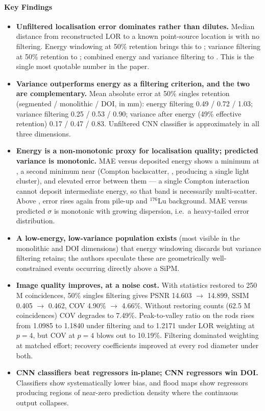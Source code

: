 \paragraph{Key Findings}
\begin{itemize}
    \item \textbf{Unfiltered localisation error dominates rather than dilutes.} Median
        distance from reconstructed LOR to a known point-source location is
        \textbf{} with no filtering. Energy windowing at 50\% retention brings this
        to ; variance filtering at 50\% retention to ; combined energy and
        variance filtering to \textbf{}. This is the single most quotable number
        in the paper.
    \item \textbf{Variance outperforms energy as a filtering criterion, and the two are
        complementary.} Mean absolute error at 50\% singles retention (segmented /
        monolithic / DOI, in mm): energy filtering 0.49 / 0.72 / 1.03; variance filtering
        0.25 / 0.53 / 0.90; variance after energy (49\% effective retention)
        0.17 / 0.47 / 0.83. Unfiltered CNN classifier is approximately  in all three
        dimensions.
    \item \textbf{Energy is a non-monotonic proxy for localisation quality; predicted
        variance is monotonic.} MAE versus deposited energy shows a minimum at , a
        second minimum near  (Compton backscatter, , producing a single
        light cluster), and elevated error between them --- a single Compton interaction
        cannot deposit intermediate energy, so that band is necessarily multi-scatter.
        Above , error rises again from pile-up and $^{176}$Lu background. MAE versus
        predicted $\sigma$ is monotonic with growing dispersion, i.e.\ a heavy-tailed error
        distribution.
    \item \textbf{A low-energy, low-variance population exists} (most visible in the
        monolithic and DOI dimensions) that energy windowing discards but variance
        filtering retains; the authors speculate these are geometrically well-constrained
        events occurring directly above a SiPM.
    \item \textbf{Image quality improves, at a noise cost.} With statistics restored to
        250 M coincidences, 50\% singles filtering gives PSNR 14.603 $\to$ 14.899,
        SSIM 0.405 $\to$ 0.462, COV 4.90\% $\to$ 4.66\%. Without restoring counts
        (62.5 M coincidences) COV degrades to 7.49\%. Peak-to-valley ratio on the 
        rods rises from 1.0985 to 1.1840 under filtering and to 1.2171 under LOR weighting
        at $p = 4$, but COV at $p = 4$ blows out to 10.19\%. Filtering dominated weighting
        at matched effort; recovery coefficients improved at every rod diameter under both.
    \item \textbf{CNN classifiers beat regressors in-plane; CNN regressors win DOI.}
        Classifiers show systematically lower bias, and flood maps show regressors
        producing regions of near-zero prediction density where the continuous output
        collapses.
\end{itemize}

